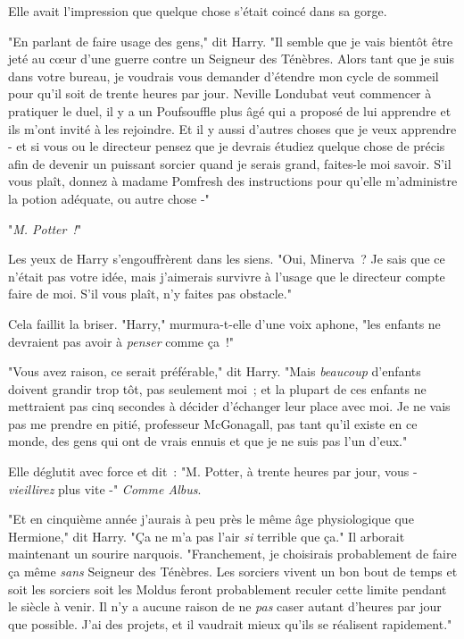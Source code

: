 Elle avait l'impression que quelque chose s'était coincé dans sa gorge.

"En parlant de faire usage des gens," dit Harry. "Il semble que je vais bientôt être jeté au cœur d'une guerre contre un Seigneur des Ténèbres. Alors tant que je suis dans votre bureau, je voudrais vous demander d'étendre mon cycle de sommeil pour qu'il soit de trente heures par jour. Neville Londubat veut commencer à pratiquer le duel, il y a un Poufsouffle plus âgé qui a proposé de lui apprendre et ils m'ont invité à les rejoindre. Et il y aussi d'autres choses que je veux apprendre - et si vous ou le directeur pensez que je devrais étudiez quelque chose de précis afin de devenir un puissant sorcier quand je serais grand, faites-le moi savoir. S'il vous plaît, donnez à madame Pomfresh des instructions pour qu'elle m'administre la potion adéquate, ou autre chose -"

"\emph{M. Potter~!}"

Les yeux de Harry s'engouffrèrent dans les siens. "Oui, Minerva~? Je sais que ce n'était pas votre idée, mais j'aimerais survivre à l'usage que le directeur compte faire de moi. S'il vous plaît, n'y faites pas obstacle."

Cela faillit la briser. "Harry," murmura-t-elle d'une voix aphone, "les enfants ne devraient pas avoir à \emph{penser} comme ça~!"

"Vous avez raison, ce serait préférable," dit Harry. "Mais \emph{beaucoup} d'enfants doivent grandir trop tôt, pas seulement moi~; et la plupart de ces enfants ne mettraient pas cinq secondes à décider d'échanger leur place avec moi. Je ne vais pas me prendre en pitié, professeur McGonagall, pas tant qu'il existe en ce monde, des gens qui ont de vrais ennuis et que je ne suis pas l'un d'eux."

Elle déglutit avec force et dit~: "M. Potter, à trente heures par jour, vous - \emph{vieillirez} plus vite -" \emph{Comme Albus}.

"Et en cinquième année j'aurais à peu près le même âge physiologique que Hermione," dit Harry. "Ça ne m'a pas l'air \emph{si} terrible que ça." Il arborait maintenant un sourire narquois. "Franchement, je choisirais probablement de faire ça même \emph{sans} Seigneur des Ténèbres. Les sorciers vivent un bon bout de temps et soit les sorciers soit les Moldus feront probablement reculer cette limite pendant le siècle à venir. Il n'y a aucune raison de ne \emph{pas} caser autant d'heures par jour que possible. J'ai des projets, et il vaudrait mieux qu'ils se réalisent rapidement."

